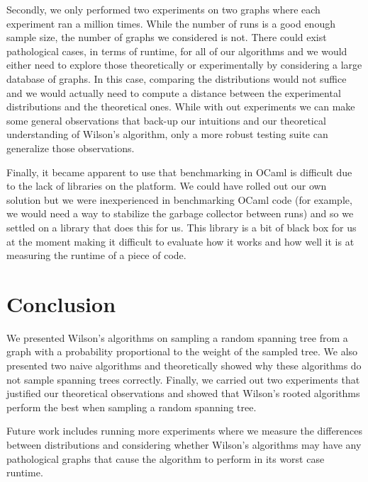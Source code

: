 \documentclass[11pt]{article}
\begin{document}
Secondly, we only performed two experiments on two graphs where each experiment ran a million times. While the number of runs is a good enough sample size, the number of graphs we considered is not. There could exist pathological cases, in terms of runtime, for all of our algorithms and we would either need to explore those theoretically or experimentally by considering a large database of graphs. In this case, comparing the distributions would not suffice and we would actually need to compute a distance between the experimental distributions and the theoretical ones. While with out experiments we can make some general observations that back-up our intuitions and our theoretical understanding of Wilson's algorithm, only a more robust testing suite can generalize those observations.

Finally, it became apparent to use that benchmarking in OCaml is difficult due to the lack of libraries on the platform. We could have rolled out our own solution but we were inexperienced in benchmarking OCaml code (for example, we would need a way to stabilize the garbage collector between runs) and so we settled on a library that does this for us. This library is a bit of black box for us at the moment making it difficult to evaluate how it works and how well it is at measuring the runtime of a piece of code.

\section{Conclusion}

We presented Wilson's algorithms on sampling a random spanning tree from a graph with a probability proportional to the weight of the sampled tree. We also presented two naive algorithms and theoretically showed why these algorithms do not sample spanning trees correctly. Finally, we carried out two experiments that justified our theoretical observations and showed that Wilson's rooted algorithms perform the best when sampling a random spanning tree.

Future work includes running more experiments where we measure the differences between distributions and considering whether Wilson's algorithms may have any pathological graphs that cause the algorithm to perform in its worst case runtime.

\printbibliography
\end{document}

